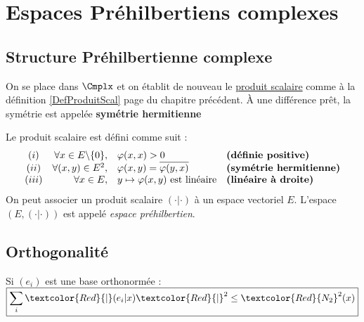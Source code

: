 \documentclass[11pt,a4paper,fleqn,pdftex]{report}
\begin{document}
\chapter{Espaces Préhilbertiens complexes}
\section{Structure Préhilbertienne complexe}
On se place dans $\Cmplx$ et on établit de nouveau le \uline{produit scalaire} comme à la définition \ref{DefProduitScal} page \pageref{DefProduitScal} du chapitre précédent. À une différence prêt, la symétrie est appelée \textbf{symétrie hermitienne}
\begin{dfn}\label{DefProduitScalCmplx}
Le produit scalaire  est défini comme suit : 
\[
\begin{array}{c r l l}
(i)&\forall x \in E\backslash \{ 0 \} , &{\varphi(x,x)>0}&\text{\textbf{(définie positive)}}\\
(ii)&\forall (x,y) \in E^2, &{\varphi (x,y) = \overline {\varphi (y,x)}} &\text{\textbf{(symétrie hermitienne)}}\\
(iii)&\forall x \in E, &{y \mapsto \varphi(x,y) \text{ est linéaire}}&\text{\textbf{(linéaire à droite)}}
\end{array}
\]
On peut associer un produit scalaire $(\cdot | \cdot )$ à un espace vectoriel $E$. L'espace $\left( E, (\cdot | \cdot ) \right)
$ est appelé \emph{espace préhilbertien}.
\end{dfn}
\section{Orthogonalité}
\begin{theorem}
Si $(e_i)$ est une base orthonormée : 
$\boxed{\sum_i \textcolor{Red}{|}(e_i|x)\textcolor{Red}{|}^2 \le \textcolor{Red}{N_2}^2 (x)}$
\end{theorem}
\end{document}
